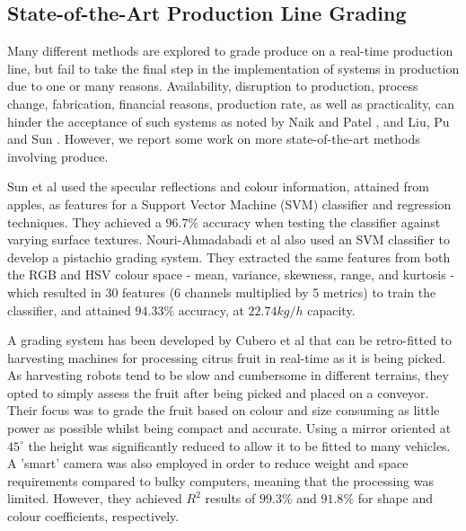 \documentclass[conference]{IEEEtran}
\begin{document}
\subsection{State-of-the-Art Production Line Grading}
 
Many different methods are explored to grade produce on a real-time production line, but fail to take the final step in the implementation of systems in production due to one or many reasons. Availability, disruption to production, process change, fabrication, financial reasons, production rate, as well as practicality, can hinder the acceptance of such systems as noted by Naik and Patel \cite{naik}, and Liu, Pu and Sun \cite{liu}. However, we report some work on more state-of-the-art methods involving produce.

Sun et al \cite{sun} used the specular reflections and colour information, attained from apples, as features for a Support Vector Machine (SVM) classifier and regression techniques. They achieved a $96.7\%$ accuracy when testing the classifier against varying surface textures. Nouri-Ahmadabadi et al \cite{nouri} also used an SVM classifier to develop a pistachio grading system. They extracted the same features from both the RGB and HSV colour space - mean, variance, skewness, range, and kurtosis - which resulted in 30 features (6 channels multiplied by 5 metrics) to train the classifier, and attained $94.33\%$ accuracy, at $22.74 kg/h$ capacity.

A grading system has been developed by Cubero et al \cite{cubero} that can be retro-fitted to harvesting machines for processing citrus fruit in real-time as it is being picked. As harvesting robots tend to be slow and cumbersome in different terrains, they opted to simply assess the fruit after being picked and placed on a conveyor. Their focus was to grade the fruit based on colour and size consuming as little power as possible whilst being compact and accurate. Using a mirror oriented at $45^{\circ}$ the height was significantly reduced to allow it to be fitted to many vehicles. A 'smart' camera was also employed in order to reduce weight and space requirements compared to bulky computers, meaning that the processing was limited. However, they achieved $R^2$ results of $99.3\%$ and $91.8\%$ for shape and colour coefficients, respectively. 
\end{document}
